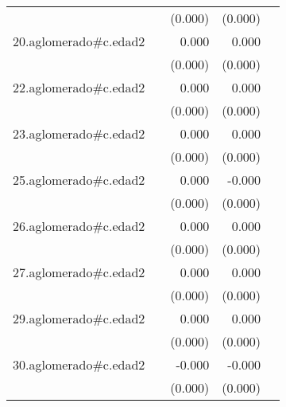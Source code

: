 {\begin{longtable}{l*{4}{D{.}{.}{-1}}}
            &                     &     (0.000)         &     (0.000)         &                     \\
\addlinespace
20.aglomerado#c.edad2&                     &       0.000\sym{*}  &       0.000         &                     \\
            &                     &     (0.000)         &     (0.000)         &                     \\
\addlinespace
22.aglomerado#c.edad2&                     &       0.000\sym{*}  &       0.000         &                     \\
            &                     &     (0.000)         &     (0.000)         &                     \\
\addlinespace
23.aglomerado#c.edad2&                     &       0.000\sym{**} &       0.000         &                     \\
            &                     &     (0.000)         &     (0.000)         &                     \\
\addlinespace
25.aglomerado#c.edad2&                     &       0.000         &      -0.000         &                     \\
            &                     &     (0.000)         &     (0.000)         &                     \\
\addlinespace
26.aglomerado#c.edad2&                     &       0.000\sym{*}  &       0.000         &                     \\
            &                     &     (0.000)         &     (0.000)         &                     \\
\addlinespace
27.aglomerado#c.edad2&                     &       0.000\sym{*}  &       0.000         &                     \\
            &                     &     (0.000)         &     (0.000)         &                     \\
\addlinespace
29.aglomerado#c.edad2&                     &       0.000\sym{*}  &       0.000         &                     \\
            &                     &     (0.000)         &     (0.000)         &                     \\
\addlinespace
30.aglomerado#c.edad2&                     &      -0.000         &      -0.000\sym{*}  &                     \\
            &                     &     (0.000)         &     (0.000)         &                     \\

\end{longtable}}
